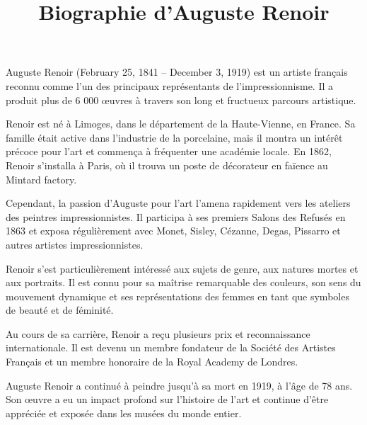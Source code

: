 \documentclass[12pt]{article}
\title{Biographie d'Auguste Renoir}
\author{}
\date{}
\begin{document}
   Auguste Renoir (February 25, 1841 – December 3, 1919) est un artiste français reconnu comme l'un des principaux représentants de l'impressionnisme. Il a produit plus de 6 000 œuvres à travers son long et fructueux parcours artistique.

   Renoir est né à Limoges, dans le département de la Haute-Vienne, en France. Sa famille était active dans l'industrie de la porcelaine, mais il montra un intérêt précoce pour l'art et commença à fréquenter une académie locale. En 1862, Renoir s'installa à Paris, où il trouva un poste de décorateur en faïence au Mintard factory.

   Cependant, la passion d'Auguste pour l'art l'amena rapidement vers les ateliers des peintres impressionnistes. Il participa à ses premiers Salons des Refusés en 1863 et exposa régulièrement avec Monet, Sisley, Cézanne, Degas, Pissarro et autres artistes impressionnistes.

   Renoir s'est particulièrement intéressé aux sujets de genre, aux natures mortes et aux portraits. Il est connu pour sa maîtrise remarquable des couleurs, son sens du mouvement dynamique et ses représentations des femmes en tant que symboles de beauté et de féminité.

   Au cours de sa carrière, Renoir a reçu plusieurs prix et reconnaissance internationale. Il est devenu un membre fondateur de la Société des Artistes Français et un membre honoraire de la Royal Academy de Londres.

   Auguste Renoir a continué à peindre jusqu'à sa mort en 1919, à l'âge de 78 ans. Son œuvre a eu un impact profond sur l'histoire de l'art et continue d'être appréciée et exposée dans les musées du monde entier.

   
\end{document}
